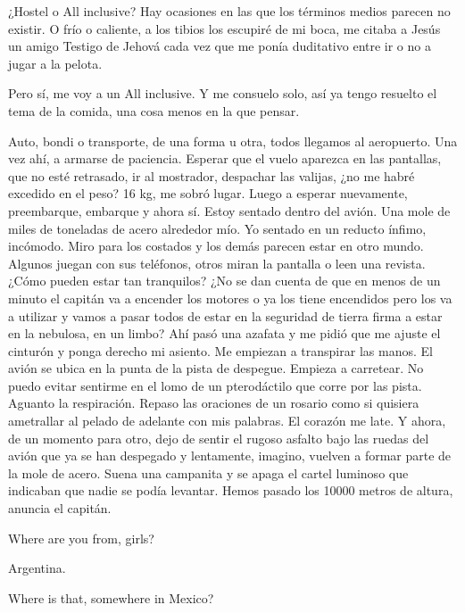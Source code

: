 \documentclass[11pt,twoside,openright,a6paper]{book}
\begin{document}
¿Hostel o All inclusive? Hay ocasiones en las que los términos medios parecen no existir. O frío o caliente, a los tibios los escupiré de mi boca, me citaba a Jesús un amigo Testigo de Jehová cada vez que me ponía duditativo entre ir o no a jugar a la pelota.

Pero sí, me voy a un All inclusive. Y me consuelo solo, así ya tengo resuelto el tema de la comida, una cosa menos en la que pensar.

\vspace{0.5cm}

Auto, bondi o transporte, de una forma u otra, todos llegamos al aeropuerto. Una vez ahí, a armarse de paciencia. Esperar que el vuelo aparezca en las pantallas, que no esté retrasado, ir al mostrador, despachar las valijas, ¿no me habré excedido en el peso? 16 kg, me sobró lugar. Luego a esperar nuevamente, preembarque, embarque y ahora sí. Estoy sentado dentro del avión. Una mole de miles de toneladas de acero alrededor mío. Yo sentado en un reducto ínfimo, incómodo. Miro para los costados y los demás parecen estar en otro mundo. Algunos juegan con sus teléfonos, otros miran la pantalla o leen una revista. ¿Cómo pueden estar tan tranquilos? ¿No se dan cuenta de que en menos de un minuto el capitán va a encender los motores o ya los tiene encendidos pero los va a utilizar y vamos a pasar todos de estar en la seguridad de tierra firma a estar en la nebulosa, en un limbo? Ahí pasó una azafata y me pidió que me ajuste el cinturón y ponga derecho mi asiento. Me empiezan a transpirar las manos. El avión se ubica en la punta de la pista de despegue. Empieza a carretear. No puedo evitar sentirme en el lomo de un pterodáctilo que corre por las pista. Aguanto la respiración. Repaso las oraciones de un rosario como si quisiera ametrallar al pelado de adelante con mis palabras. El corazón me late. Y ahora, de un momento para otro, dejo de sentir el rugoso asfalto bajo las ruedas del avión que ya se han despegado y lentamente, imagino, vuelven a formar parte de la mole de acero. Suena una campanita y se apaga el cartel luminoso que indicaban que nadie se podía levantar. Hemos pasado los 10000 metros de altura, anuncia el capitán.

\vspace{0.5cm}

Where are you from, girls?

Argentina.

Where is that, somewhere in Mexico?

\vspace{0.5cm}
\end{document}
